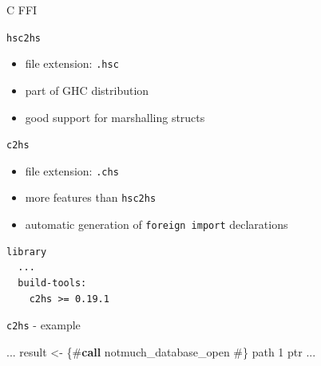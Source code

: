 \documentclass[ignorenonframetext,aspectratio=169]{beamer}
\newenvironment{Shaded}{}{}
\newcommand{\KeywordTok}[1]{\textcolor[rgb]{0.00,0.44,0.13}{\textbf{{#1}}}}
\newcommand{\DataTypeTok}[1]{\textcolor[rgb]{0.56,0.13,0.00}{{#1}}}
\newcommand{\DecValTok}[1]{\textcolor[rgb]{0.25,0.63,0.44}{{#1}}}
\newcommand{\FloatTok}[1]{\textcolor[rgb]{0.25,0.63,0.44}{{#1}}}
\newcommand{\StringTok}[1]{\textcolor[rgb]{0.25,0.44,0.63}{{#1}}}
\newcommand{\OtherTok}[1]{\textcolor[rgb]{0.00,0.44,0.13}{{#1}}}
\newcommand{\FunctionTok}[1]{\textcolor[rgb]{0.02,0.16,0.49}{{#1}}}
\newcommand{\NormalTok}[1]{{#1}}
\providecommand{\tightlist}{%
  \setlength{\itemsep}{0pt}\setlength{\parskip}{0pt}}
\begin{document}
\begin{frame}[fragile]{C FFI}

\begin{Shaded}
\end{Shaded}

\end{frame}

\begin{frame}[fragile]{\tt hsc2hs}

\begin{itemize}
\tightlist
\item
  file extension: \texttt{.hsc}
\item
  part of GHC distribution
\item
  good support for marshalling structs
\end{itemize}

\end{frame}

\begin{frame}[fragile]{\tt c2hs}

\begin{itemize}
\tightlist
\item
  file extension: \texttt{.chs}
\item
  more features than \texttt{hsc2hs}
\item
  automatic generation of \texttt{foreign\ import} declarations
\end{itemize}

\begin{verbatim}
library
  ...
  build-tools:
    c2hs >= 0.19.1
\end{verbatim}

\end{frame}

\begin{frame}[fragile]{\texttt{c2hs} - example}

\begin{Shaded}
\begin{Highlighting}[]
...
  \NormalTok{result }\OtherTok{<-} \StringTok{\{#}\KeywordTok{call} \StringTok{notmuch_database_open #\}} \NormalTok{path \DecValTok{1} ptr}
  ...
\end{Highlighting}
\end{Shaded}

\end{frame}
\end{document}
